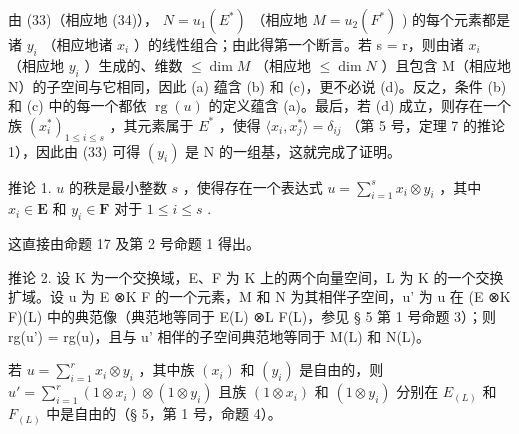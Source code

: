 由 (33)（相应地 (34)）， \(N = u_{1}(E^{*})\) （相应地 \(M = u_{2}(F^{*})\) ) 的每个元素都是诸 \(y_{i}\) （相应地诸 \(x_{i}\) ）的线性组合；由此得第一个断言。若 s = r，则由诸 \(x_{i}\) （相应地 \(y_{i}\) ）生成的、维数 \(\leqslant \dim M\) （相应地 \(\leqslant \dim N\) ）且包含 M（相应地 N）的子空间与它相同，因此 (a) 蕴含 (b) 和 (c)，更不必说 (d)。反之，条件 (b) 和 (c) 中的每一个都依 \(\operatorname{rg}(u)\) 的定义蕴含 (a)。最后，若 (d) 成立，则存在一个族 \((x_{i}^{*})_{1\leqslant i\leqslant s}\) ，其元素属于 \(E^{*}\) ，使得 \(\langle x_{i}, x_{j}^{*}\rangle = \delta_{ij}\) （第 5 号，定理 7 的推论 1），因此由 (33) 可得 \((y_{i})\) 是 N 的一组基，这就完成了证明。

推论 1. \(u\) 的秩是最小整数 \(s\) ，使得存在一个表达式 \(u = \sum_{i=1}^{s} x_i \otimes y_i\) ，其中 \(x_i \in \mathbf{E}\) 和 \(y_i \in \mathbf{F}\) 对于 \(1 \leqslant i \leqslant s\) .

这直接由命题 17 及第 2 号命题 1 得出。

推论 2. 设 K 为一个交换域，E、F 为 K 上的两个向量空间，L 为 K 的一个交换扩域。设 u 为 E ⊗K F 的一个元素，M 和 N 为其相伴子空间，u' 为 u 在 (E ⊗K F)(L) 中的典范像（典范地等同于 E(L) ⊗L F(L)，参见 § 5 第 1 号命题 3）；则 rg(u') = rg(u)，且与 u' 相伴的子空间典范地等同于 M(L) 和 N(L)。

若 \(u = \sum_{i=1}^{r} x_i \otimes y_i\) ，其中族 \((x_i)\) 和 \((y_i)\) 是自由的，则 \(u' = \sum_{i=1}^{r} (1 \otimes x_i) \otimes (1 \otimes y_i)\) 且族 \((1 \otimes x_i)\) 和 \((1 \otimes y_i)\) 分别在 \(E_{(L)}\) 和 \(F_{(L)}\) 中是自由的（§ 5，第 1 号，命题 4）。

